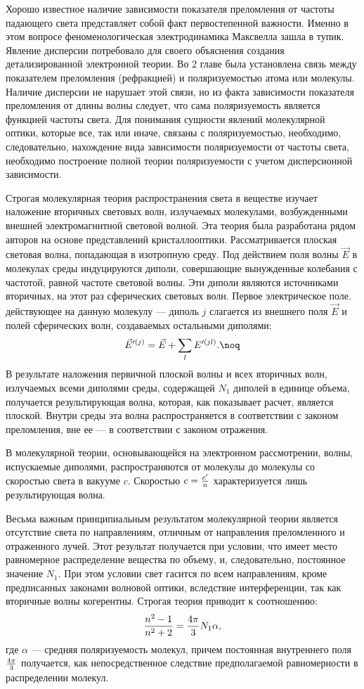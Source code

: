 
 \vskip 2mm Хорошо
известное наличие зависимости показателя преломления от частоты
падающего света представляет собой факт первостепенной важности.
Именно в этом вопросе феноменологическая электродинамика Максвелла
зашла в тупик. Явление дисперсии потребовало для своего объяснения
создания детализированной электронной теории. Во 2 главе была
установлена связь между показателем преломления (рефракцией) и
поляризуемостью атома или молекулы. Наличие дисперсии не нарушает
этой связи, но из факта зависимости показателя преломления от
длины волны следует, что сама поляризуемость является функцией
частоты света. Для понимания сущности явлений молекулярной оптики,
которые все, так или иначе, связаны с поляризуемостью, необходимо,
следовательно, нахождение вида зависимости поляризуемости от
частоты света, необходимо построение полной теории поляризуемости
с учетом дисперсионной зависимости.

Строгая молекулярная теория распространения света в веществе
изучает наложение вторичных световых волн, излучаемых молекулами,
возбужденными внешней электромагнитной световой волной. Эта теория
была разработана рядом авторов на основе представлений
кристаллооптики. Рассматривается плоская световая волна,
попадающая в изотропную среду. Под действием  поля волны $\vec E$
в молекулах среды индуцируются диполи, совершающие вынужденные
колебания с частотой, равной частоте световой волны. Эти диполи
являются источниками вторичных, на этот раз сферических световых
волн. Первое электрическое поле. действующее на данную молекулу
--- диполь $j$ слагается из внешнего поля $\vec E$ и полей
сферических волн, создаваемых остальными диполями:
$$\vec E'^{(j)}=\vec E+\sum_{l}E'^{(jl)}.\noq$$
В результате наложения первичной плоской волны и всех вторичных
волн, излучаемых всеми диполями среды, содержащей $N_1$ диполей в
единице объема, получается результирующая волна, которая, как
показывает расчет, является плоской. Внутри среды эта волна
распространяется в соответствии с законом преломления, вне ее ---
в соответствии с законом отражения.

В молекулярной теории, основывающейся на электронном рассмотрении,
волны, испускаемые диполями, распространяются от молекулы до
молекулы со скоростью света в вакууме $c$. Скоростью $c={c'\over
n}$ характеризуется лишь результирующая волна.

Весьма важным принципиальным результатом молекулярной теории
является отсутствие света по направлениям, отличным от направления
преломленного и отраженного лучей. Этот результат получается при
условии, что имеет место равномерное распределение вещества по
объему, и, следовательно, постоянное значение $N_1$. При этом
условии свет гасится по всем направлениям, кроме предписанных
законами волновой оптики, вследствие интерференции, так как
вторичные волны когерентны. Строгая теория приводит к соотношению:
$${n^2-1\over n^2+2}={4\pi\over3}N_1\alpha,$$
где $\alpha$ --- средняя поляризуемость молекул, причем постоянная
внутреннего поля ${4\pi\over3}$ получается, как непосредственное
следствие предполагаемой равномерности в распределении молекул.

